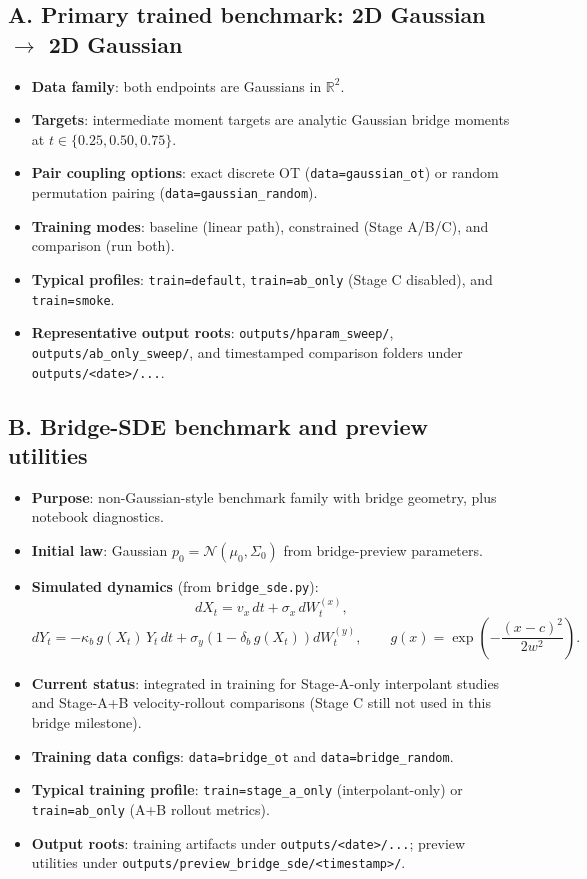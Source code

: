 \documentclass[11pt]{article}
\begin{document}
\subsection*{A. Primary trained benchmark: 2D Gaussian $\rightarrow$ 2D Gaussian}
\begin{itemize}
    \item \textbf{Data family}: both endpoints are Gaussians in $\mathbb{R}^2$.
    \item \textbf{Targets}: intermediate moment targets are analytic Gaussian bridge moments at
    $t\in\{0.25,0.50,0.75\}$.
    \item \textbf{Pair coupling options}: exact discrete OT (\texttt{data=gaussian\_ot}) or random permutation pairing (\texttt{data=gaussian\_random}).
    \item \textbf{Training modes}: baseline (linear path), constrained (Stage A/B/C), and comparison (run both).
    \item \textbf{Typical profiles}: \texttt{train=default}, \texttt{train=ab\_only} (Stage C disabled), and \texttt{train=smoke}.
    \item \textbf{Representative output roots}: \texttt{outputs/hparam\_sweep/}, \texttt{outputs/ab\_only\_sweep/}, and timestamped comparison folders under \texttt{outputs/<date>/...}.
\end{itemize}

\subsection*{B. Bridge-SDE benchmark and preview utilities}
\begin{itemize}
    \item \textbf{Purpose}: non-Gaussian-style benchmark family with bridge geometry, plus notebook diagnostics.
    \item \textbf{Initial law}: Gaussian $p_0=\mathcal{N}(\mu_0,\Sigma_0)$ from bridge-preview parameters.
    \item \textbf{Simulated dynamics} (from \texttt{bridge\_sde.py}):
    \[
    dX_t = v_x\,dt + \sigma_x\,dW_t^{(x)},
    \]
    \[
    dY_t =
    -\kappa_b\,g(X_t)\,Y_t\,dt
    + \sigma_y\!\left(1-\delta_b\,g(X_t)\right)dW_t^{(y)},
    \qquad
    g(x)=\exp\!\left(-\frac{(x-c)^2}{2w^2}\right).
    \]
    \item \textbf{Current status}: integrated in training for Stage-A-only interpolant studies and Stage-A+B velocity-rollout comparisons (Stage C still not used in this bridge milestone).
    \item \textbf{Training data configs}: \texttt{data=bridge\_ot} and \texttt{data=bridge\_random}.
    \item \textbf{Typical training profile}: \texttt{train=stage\_a\_only} (interpolant-only) or \texttt{train=ab\_only} (A+B rollout metrics).
    \item \textbf{Output roots}: training artifacts under \texttt{outputs/<date>/...}; preview utilities under \texttt{outputs/preview\_bridge\_sde/<timestamp>/}.
\end{itemize}
\end{document}
